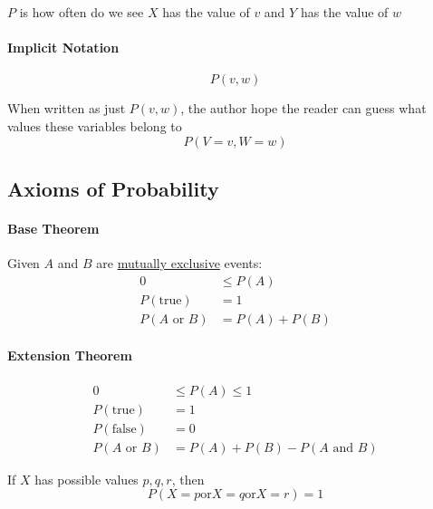     $ P $ is how often do we see $ X $ has the value of $ v $ and $ Y $ has
    the value of $ w $

    \paragraph{Implicit Notation}
    \begin{equation}
      P\left( v, w \right)
    \end{equation}

    When written as just $ P\left( v, w \right) $, the author
    hope the reader can guess what values these variables belong to
    \begin{displaymath}
      P\left( V = v, W = w \right)
    \end{displaymath}

  \subsection{Axioms of Probability}

    \paragraph{Base Theorem}
    Given $ A $ and $ B $ are \ul{mutually exclusive} events:
    \begin{align}
      0 &\le P\left( A \right) \\
      P\left( \text{true} \right) &= 1 \\
      P\left( A \text{ or } B \right) &= P\left( A \right) + P\left( B \right)
    \end{align}

    \paragraph{Extension Theorem}
    \begin{align}
      0 &\le P\left( A \right) \le 1 \\
      P\left( \text{true} \right) &= 1 \\
      P\left( \text{false} \right) &= 0 \\
      P\left( A \text{ or } B \right)
        &= P\left( A \right) + P\left( B \right)
        - P\left( A \text{ and } B \right)
    \end{align}

    If $ X $ has possible values $ p, q, r $, then
    \begin{equation}
      P\left( X = p \text{or} X = q \text{or} X = r \right) = 1
    \end{equation}

